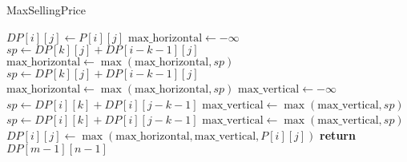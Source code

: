 \documentclass{article}
\begin{document}
\begin{algorithm}
\caption{MaxSellingPrice}
\begin{algorithmic}[1]
                \State $DP[i][j] \gets P[i][j]$ 
            \Else
                \State $\text{max\_horizontal} \gets {-\infty }$
                 
                        \State $sp \gets DP[k][j] + DP[i-k-1][j]$ 
                        \State $\text{max\_horizontal} \gets \max(\text{max\_horizontal}, sp)$
                    \EndFor
                \Else {}
                        \State $sp \gets DP[k][j] + DP[i-k-1][j]$ 
                        \State $\text{max\_horizontal} \gets \max(\text{max\_horizontal}, sp)$
                    \EndFor
                \EndIf
                \State $\text{max\_vertical} \gets {- \infty }$
                 
                        \State $sp \gets DP[i][k] + DP[i][j-k-1]$ 
                        \State $\text{max\_vertical} \gets \max(\text{max\_vertical}, sp)$
                    \EndFor
                \Else {}
                        \State $sp \gets DP[i][k] + DP[i][j-k-1]$ 
                        \State $\text{max\_vertical} \gets \max(\text{max\_vertical}, sp)$
                    \EndFor
                \EndIf
                \State $DP[i][j] \gets \max(\text{max\_horizontal}, \text{max\_vertical}, P[i][j])$
            \EndIf
        \EndFor
    \EndFor
    \State \textbf{return} $DP[m-1][n-1]$ 
\EndProcedure
\end{algorithmic}
\end{algorithm}
\end{document}
